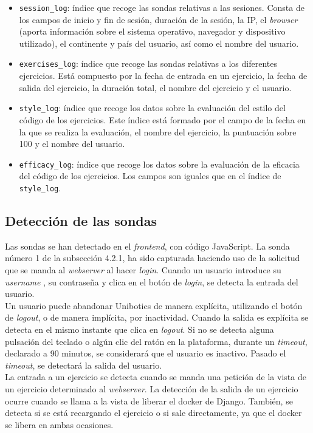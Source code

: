 \begin{itemize}
\item \texttt{session\_log}: índice que recoge las sondas relativas a las sesiones. Consta de los campos de inicio y fin de sesión, duración de la sesión, la IP, el \textit{browser} (aporta información sobre el sistema operativo, navegador y dispositivo utilizado), el continente y país del usuario, así como el nombre del usuario.
\item \texttt{exercises\_log}: índice que recoge las sondas relativas a los diferentes ejercicios. Está compuesto por la fecha de entrada en un ejercicio, la fecha de salida del ejercicio, la duración total, el nombre del ejercicio y el usuario.
\newpage
\item \texttt{style\_log}: índice que recoge los datos sobre la evaluación del estilo del código de los ejercicios. Este índice está formado por el campo de la fecha en la que se realiza la evaluación, el nombre del ejercicio, la puntuación sobre 100 y el nombre del usuario.
\item \texttt{efficacy\_log}: índice que recoge los datos sobre la evaluación de la eficacia del código de los ejercicios. Los campos son iguales que en el índice de \texttt{style\_log}.
\end{itemize}
\subsection{Detección de las sondas}
Las sondas se han detectado en el \textit{frontend}, con código JavaScript. La sonda número 1 de la subsección 4.2.1, ha sido capturada haciendo uso de la solicitud que se manda al \textit{webserver }al hacer \textit{login}. Cuando un usuario introduce su \textit{username }, su contraseña y clica en el botón de \textit{login}, se detecta la entrada del usuario. \\

Un usuario puede abandonar Unibotics de manera explícita, utilizando el botón de \textit{logout}, o de manera implícita, por inactividad. Cuando la salida es explícita se detecta en el mismo instante que clica en \textit{logout}.  Si no se detecta alguna pulsación del teclado o algún clic del ratón en la plataforma, durante un \textit{timeout}, declarado a 90 minutos, se considerará que el usuario es inactivo. Pasado el \textit{timeout}, se detectará la salida del usuario.\\

La entrada a un ejercicio se detecta cuando se manda una petición de la vista de un ejercicio determinado al \textit{webserver}. La detección de la salida de un ejercicio ocurre cuando se llama a la vista de liberar el docker de Django. También, se detecta si se está recargando el ejercicio o si sale directamente, ya que el docker se libera en ambas ocasiones.\\

